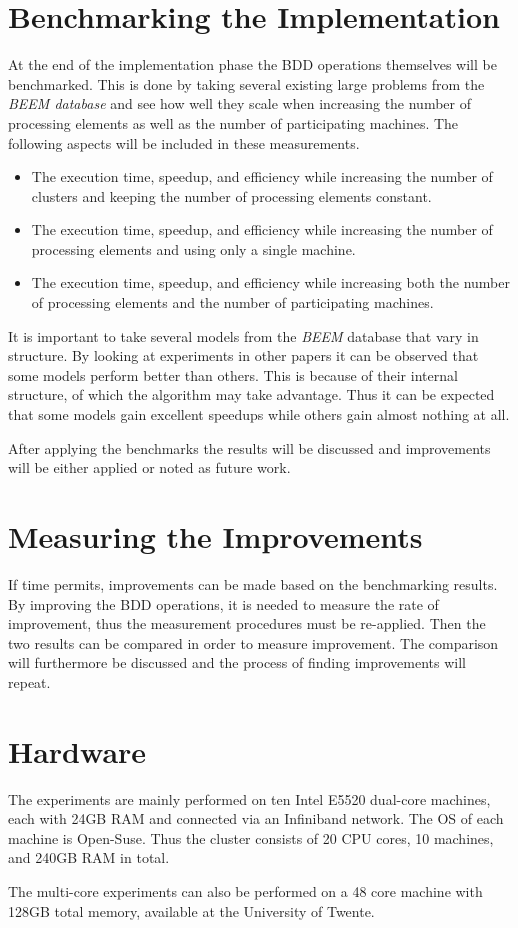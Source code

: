 \section{Benchmarking the Implementation}
At the end of the implementation phase the BDD operations themselves will be benchmarked. This is done by taking several existing large problems from the \emph{BEEM database} and see how well they scale when increasing the number of processing elements as well as the number of participating machines. The following aspects will be included in these measurements.

\begin{itemize}
\item{The execution time, speedup, and efficiency while increasing the number of clusters and keeping the number of processing elements constant.}
\item{The execution time, speedup, and efficiency while increasing the number of processing elements and using only a single machine.}
\item{The execution time, speedup, and efficiency while increasing both the number of processing elements and the number of participating machines.}
\end{itemize}

It is important to take several models from the \emph{BEEM} database that vary in structure. By looking at experiments in other papers it can be observed that some models perform better than others. This is because of their internal structure, of which the algorithm may take advantage. Thus it can be expected that some models gain excellent speedups while others gain almost nothing at all.

After applying the benchmarks the results will be discussed and improvements will be either applied or noted as future work.

\section{Measuring the Improvements}
If time permits, improvements can be made based on the benchmarking results. By improving the BDD operations, it is needed to measure the rate of improvement, thus the measurement procedures must be re-applied. Then the two results can be compared in order to measure improvement. The comparison will furthermore be discussed and the process of finding improvements will repeat.

\section{Hardware}
The experiments are mainly performed on ten Intel E5520 dual-core machines, each with 24GB RAM and connected via an Infiniband network. The OS of each machine is Open-Suse. Thus the cluster consists of 20 CPU cores, 10 machines, and 240GB RAM in total.

The multi-core experiments can also be performed on a 48 core machine with 128GB total memory, available at the University of Twente. 